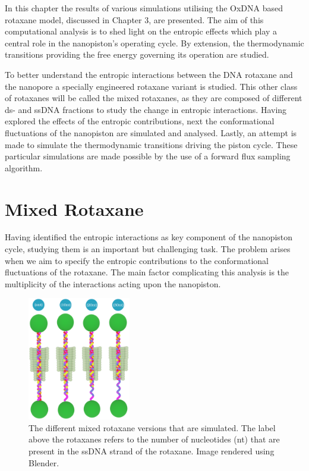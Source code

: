 \vspace{2cm}
\noindent In this chapter the results of various simulations utilising the OxDNA based
rotaxane model, discussed in Chapter 3, are presented. The aim of this computational
analysis is to shed light on
the entropic effects which play a central role in the nanopiston's operating cycle. By
extension, the thermodynamic transitions providing the free energy governing its
operation are studied.

To better understand the entropic interactions between the DNA rotaxane and the nanopore
a specially engineered rotaxane variant is studied. This other class of rotaxanes will be
called the mixed rotaxanes, as they are composed of different ds- and ssDNA fractions to
study the change in entropic interactions. Having explored the effects of the
entropic contributions, next the conformational fluctuations of the nanopiston are
simulated and analysed. Lastly, an attempt is made to simulate the thermodynamic
transitions driving the piston cycle. These particular simulations are made possible
by the use of a forward flux sampling algorithm.

\newpage

\section{Mixed Rotaxane}



Having identified the entropic interactions as key component of the nanopiston cycle,
studying them is an important but challenging task. The problem arises when we aim to
specify the entropic contributions to the conformational fluctuations of the rotaxane.
The
main factor complicating this analysis is the multiplicity of the interactions acting
upon the nanopiston.

\begin{figure}
  \vspace{-0.8cm}
  \begin{center}
    \includegraphics[width=0.4\textwidth]{Figures/mixed.png}
    \caption[Figure of the simulated mixed rotaxanes.]{{\small The different mixed
    rotaxane
    versions that are simulated. The label above the rotaxanes refers to the number of
    nucleotides (nt) that are present in the ssDNA strand of the rotaxane. Image rendered
    using Blender.\cite{blender}}}
  \label{fig:mixed}
\end{center}
\end{figure}

